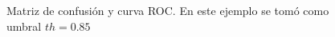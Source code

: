 \begin{figure}
	\centering
	\caption{Matriz de confusión y curva ROC. En este ejemplo se tomó como umbral $th=0.85$} \label{fig:1d-experiment-085}
\end{figure}

